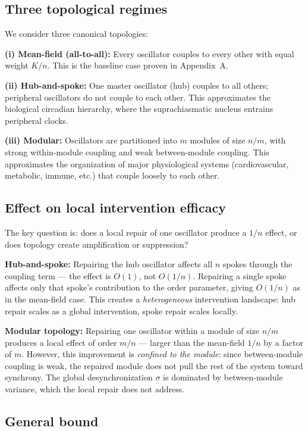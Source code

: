 \documentclass[12pt]{article}
\begin{document}
\subsection{Three topological regimes}

We consider three canonical topologies:

\textbf{(i) Mean-field (all-to-all):} Every oscillator couples to every other
with equal weight $K/n$. This is the baseline case proven in Appendix~A.

\textbf{(ii) Hub-and-spoke:} One master oscillator (hub) couples to all others;
peripheral oscillators do not couple to each other. This approximates the
biological circadian hierarchy, where the suprachiasmatic nucleus entrains
peripheral clocks.

\textbf{(iii) Modular:} Oscillators are partitioned into $m$ modules of size
$n/m$, with strong within-module coupling and weak between-module coupling.
This approximates the organization of major physiological systems (cardiovascular,
metabolic, immune, etc.) that couple loosely to each other.

\subsection{Effect on local intervention efficacy}

The key question is: does a local repair of one oscillator produce a $1/n$
effect, or does topology create amplification or suppression?

\textbf{Hub-and-spoke:} Repairing the hub oscillator affects all $n$ spokes
through the coupling term — the effect is $O(1)$, not $O(1/n)$. Repairing
a single spoke affects only that spoke's contribution to the order parameter,
giving $O(1/n)$ as in the mean-field case. This creates a \emph{heterogeneous}
intervention landscape: hub repair scales as a global intervention, spoke repair
scales locally.

\textbf{Modular topology:} Repairing one oscillator within a module of size
$n/m$ produces a local effect of order $m/n$ — larger than the mean-field
$1/n$ by a factor of $m$. However, this improvement is \emph{confined to the
module}: since between-module coupling is weak, the repaired module does not
pull the rest of the system toward synchrony. The global desynchronization
$\sigma$ is dominated by between-module variance, which the local repair
does not address.

\subsection{General bound}
\end{document}
